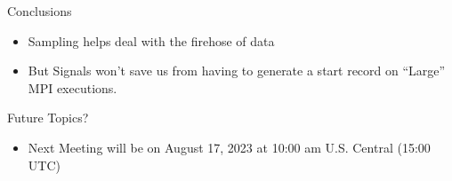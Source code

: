 \documentclass{beamer}
\begin{document}
\begin{frame}{Conclusions}
  \begin{itemize}
    \item Sampling helps deal with the firehose of data
    \item But Signals won't save us from having to generate a start
      record on ``Large'' MPI executions.
  \end{itemize}
\end{frame}

\begin{frame}{Future Topics?}
  \begin{itemize}
    \item Next Meeting will be on August 17, 2023 at 10:00 am
      U.S. Central (15:00 UTC)
  \end{itemize}
\end{frame}

%
\end{document}
